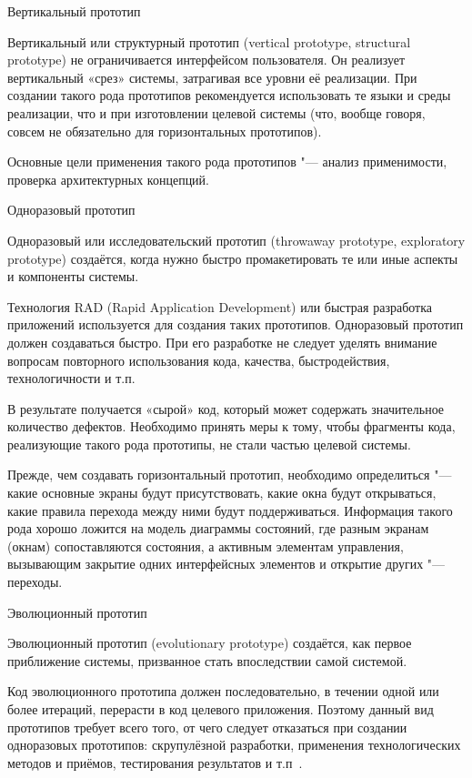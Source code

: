 \documentclass{../industrial-development}
\begin{document}
{\alert{Вертикальный прототип}

Вертикальный или структурный прототип (vertical prototype, structural prototype) не ограничивается интерфейсом пользователя. Он реализует вертикальный «срез» системы, затрагивая все уровни её реализации. При создании такого рода прототипов рекомендуется использовать те языки и среды реализации, что и при изготовлении целевой системы (что, вообще говоря, совсем не обязательно для горизонтальных прототипов).

Основные цели применения такого рода прототипов "--- анализ применимости, проверка архитектурных концепций.

\alert{Одноразовый прототип}

Одноразовый или исследовательский прототип (throwaway prototype, exploratory prototype) создаётся, когда нужно быстро промакетировать те или иные аспекты и компоненты системы.

Технология RAD (Rapid Application Development) или быстрая разработка приложений используется для создания таких прототипов. Одноразовый прототип должен создаваться быстро. При его разработке не следует уделять внимание вопросам повторного использования кода, качества, быстродействия, технологичности и т.п.

В результате получается «сырой» код, который может содержать значительное количество дефектов. Необходимо принять меры к тому, чтобы фрагменты кода, реализующие такого рода прототипы, не стали частью целевой системы.

Прежде, чем создавать горизонтальный прототип, необходимо определиться "--- какие основные экраны будут присутствовать, какие окна
будут открываться, какие правила перехода между ними будут поддерживаться. Информация такого рода хорошо ложится на модель диаграммы состояний, где разным экранам (окнам) сопоставляются состояния, а активным элементам управления, вызывающим закрытие одних интерфейсных элементов и открытие других "--- переходы.

\alert{Эволюционный прототип}

Эволюционный прототип (evolutionary prototype) создаётся, как первое приближение системы, призванное стать впоследствии самой системой.

Код эволюционного прототипа должен последовательно, в течении одной или более итераций, перерасти в код целевого приложения. Поэтому данный вид прототипов требует всего того, от чего следует отказаться при создании одноразовых прототипов: скрупулёзной разработки, применения технологических методов и приёмов, тестирования результатов и т.п~\cite[с.~54--55]{Maglinec}.




}
\end{document}
